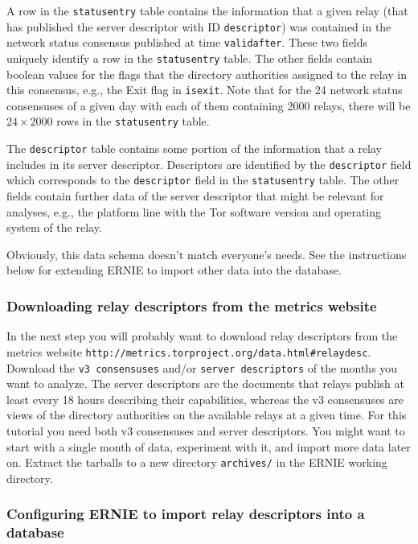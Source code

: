 \documentclass{article}
\begin{document}
A row in the \verb+statusentry+ table contains the information that a
given relay (that has published the server descriptor with ID
\verb+descriptor+) was contained in the network status consensus published
at time \verb+validafter+.
These two fields uniquely identify a row in the \verb+statusentry+ table.
The other fields contain boolean values for the flags that the directory
authorities assigned to the relay in this consensus, e.g., the Exit flag
in \verb+isexit+.
Note that for the 24 network status consensuses of a given day with each
of them containing 2000 relays, there will be $24 \times 2000$ rows in the
\verb+statusentry+ table.

The \verb+descriptor+ table contains some portion of the information that
a relay includes in its server descriptor.
Descriptors are identified by the \verb+descriptor+ field which
corresponds to the \verb+descriptor+ field in the \verb+statusentry+
table.
The other fields contain further data of the server descriptor that might
be relevant for analyses, e.g., the platform line with the Tor software
version and operating system of the relay.

Obviously, this data schema doesn't match everyone's needs.
See the instructions below for extending ERNIE to import other data into
the database.

\subsubsection{Downloading relay descriptors from the metrics website}

In the next step you will probably want to download relay descriptors from
the metrics website
\verb+http://metrics.torproject.org/data.html#relaydesc+.
Download the \verb+v3 consensuses+ and/or \verb+server descriptors+ of the
months you want to analyze.
The server descriptors are the documents that relays publish at least
every 18 hours describing their capabilities, whereas the v3 consensuses
are views of the directory authorities on the available relays at a given
time.
For this tutorial you need both v3 consensuses and server descriptors.
You might want to start with a single month of data, experiment with it,
and import more data later on.
Extract the tarballs to a new directory \verb+archives/+ in the ERNIE
working directory.

\subsubsection{Configuring ERNIE to import relay descriptors into a
database}
\end{document}
